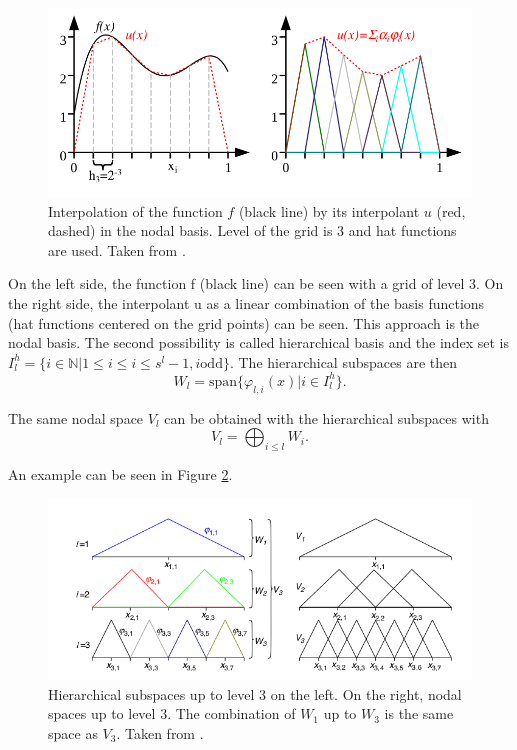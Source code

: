 \begin{figure}[htbp!]
	\centering
	\includegraphics[scale=0.5]{figures/weighted_sum.png}
	\caption{ Interpolation of the function $ f $ (black line) by its interpolant $ u $ (red, dashed) in the nodal basis. Level of the grid is 3 and hat functions are used. Taken from \cite{pfluger2010spatially}. }
	\label{fig:interpolant}
\end{figure}

On the left side, the function f (black line) can be seen with a grid of level 3. On the right side, the interpolant u as a linear combination of the basis functions (hat functions centered on the grid points) can be seen. This approach is the nodal basis. The second possibility is called hierarchical basis and the index set is $I_l^h = \{i \in \mathbb{N} | 1 \le i \le i \le s^l-1, i \text{odd}\}$. The hierarchical subspaces are then 
\begin{equation}
	W_l = \text{span}\{ \varphi_{l,i}(x) | i \in I_l^h\}.
\end{equation}

The same nodal space $ V_l $ can be obtained with the hierarchical subspaces with 
\begin{equation}
	V_l = \bigoplus_{i \le l} W_i.
\end{equation}

An example can be seen in Figure \ref{fig:hierarchical_basis}.
\begin{figure}[htbp!]
	\centering
	\includegraphics[scale=0.5]{figures/hierarchical_basis.png}
	\caption{ Hierarchical subspaces up to level 3 on the left. On the right, nodal spaces up to level 3. The combination of $ W_1 $ up to $ W_3 $ is the same space as $ V_3 $. Taken from \cite{pfluger2010spatially}. }
	\label{fig:hierarchical_basis}
\end{figure}

